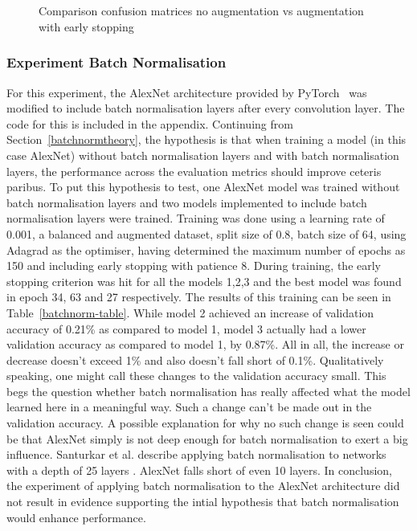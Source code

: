 \begin{figure}[ht]
\begin{subfigure}{0.49\columnwidth}
		~\label{fig:augmentationearly}
	\end{subfigure}
	\caption{Comparison confusion matrices no augmentation vs augmentation with early stopping}~\label{fig:augearlycombined}
\end{figure}



\subsubsection{Experiment Batch Normalisation}
For this experiment, the AlexNet architecture provided by PyTorch~\cite{pytorchAlexNet} was modified to include batch normalisation layers after every convolution layer. The code for this is included in the appendix. Continuing from Section~\ref{batchnormtheory}, the hypothesis is that when training a model (in this case AlexNet) without batch normalisation layers and with batch normalisation layers, the performance across the evaluation metrics should improve ceteris paribus. To put this hypothesis to test, one AlexNet model was trained without batch normalisation layers and two models implemented to include batch normalisation layers were trained. Training was done using a learning rate of 0.001, a balanced and augmented dataset, split size of 0.8, batch size of 64, using Adagrad as the optimiser, having determined the maximum number of epochs as 150 and including early stopping with patience 8. During training, the early stopping criterion was hit for all the models 1,2,3 and the best model was found in epoch 34, 63 and 27 respectively. The results of this training can be seen in Table~\ref{batchnorm-table}. While model 2 achieved an increase of validation accuracy of 0.21\% as compared to model 1, model 3 actually had a lower validation accuracy as compared to model 1, by 0.87\%. All in all, the increase or decrease doesn't exceed 1\% and also doesn't fall short of 0.1\%. Qualitatively speaking, one might call these changes to the validation accuracy small. This begs the question whether batch normalisation has really affected what the model learned here in a meaningful way. Such a change can't be made out in the validation accuracy. A possible explanation for why no such change is seen could be that AlexNet simply is not deep enough for batch normalisation to exert a big influence. Santurkar et al\@. describe applying batch normalisation to networks with a depth of 25 layers \citep{santurkar2018does}. AlexNet falls short of even 10 layers. In conclusion, the experiment of applying batch normalisation to the AlexNet architecture did not result in evidence supporting the intial hypothesis that batch normalisation would enhance performance.
